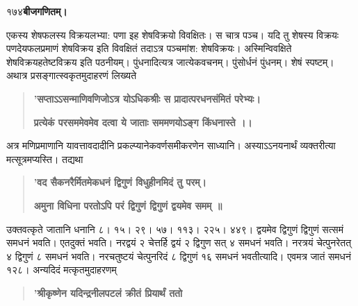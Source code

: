 \documentclass[11pt, openany]{book}
\begin{document}
\onehalfspacing
 १७४\hspace{2in}\textbf{बीजगणितम्।} 

\vspace{5mm}

\begin{sloppypar}
\hangindent=0.2in \hspace{0.2in}एकस्य शेषफलस्य विक्रयलभ्या: पणा इह शेषविक्रयो विवक्षितः। स चात्र पञ्च। यदि तु शेषस्य विक्रयः पणदेयफलप्रमाणं शेषविक्रय इति विवक्षितं तदाऽत्र पञ्चमांश: शेषविक्रयः। अस्मिन्विवक्षिते शेषविक्रयहतेष्टविक्रय इति पठनीयम्। पुंधनादित्यत्र जात्येकवचनम्। पुंसोर्धनं पुंधनम्। शेषं स्पष्टम्।\\

\hangindent=0.2in \hspace{0.2in}अथात्र प्रसङ्गात्स्वकृतमुदाहरणं लिख्यते\textendash

\begin{quote}
\hspace{0.5in}\textbf{'सप्ताऽऽसन्माणिवणिजोऽत्र योऽधिकश्रीः स प्रादात्परधनसंमितं परेभ्यः।}

\hspace{0.5in}\textbf{प्रत्येकं परसममेवमेव दत्वा ये जाताः सममणयोऽङ्ग किंधनास्ते ।।}
\end{quote}

\hangindent=0.2in \hspace{0.2in}अत्र मणिप्रमाणानि यावत्तावदादीनि प्रकल्प्यानेकवर्णसमीकरणेन साध्यानि। अस्याऽऽनयनार्थं व्यक्तरीत्या मत्सूत्रमप्यस्ति। तद्यथा\textendash

\begin{quote}
\hspace{1in}\textbf{'वद सैकनरैर्मितमेकधनं द्विगुणं विधुहीनमिदं तु परम्।}

\hspace{1in}\textbf{अमुना विधिना परतोऽपि परं द्विगुणं द्विगुणं द्वयमेव समम् ॥}
\end{quote}

\hangindent=0.2in \hspace{0.2in}उक्तवत्कृते जातानि धनानि ८। १५। २९। ५७। ११३। २२५। ४४९। द्वयमेव द्विगुणं द्विगुणं सत्समं समधनं भवति। एतदुक्तं भवति। नरद्वयं २ चेत्तर्हि द्वयं २ द्विगुण सत् ४ समधनं भवति। नरत्रयं चेत्पुनरेतत् ४ द्विगुणं ८ समधनं भवति। नरचतुष्टयं चेत्पुनरिदं ८ द्विगुणं १६ समधनं भवतीत्यादि। एवमत्र जातं समधनं १२८। अन्यदिदं मत्कृतमुदाहरणम्\textendash

\begin{quote}
\hspace{1in}\textbf{'श्रीकृष्णेन यदिन्द्रनीलपटलं क्रीतं प्रियार्थं ततो}


\end{quote}
\end{sloppypar}
\end{document}
